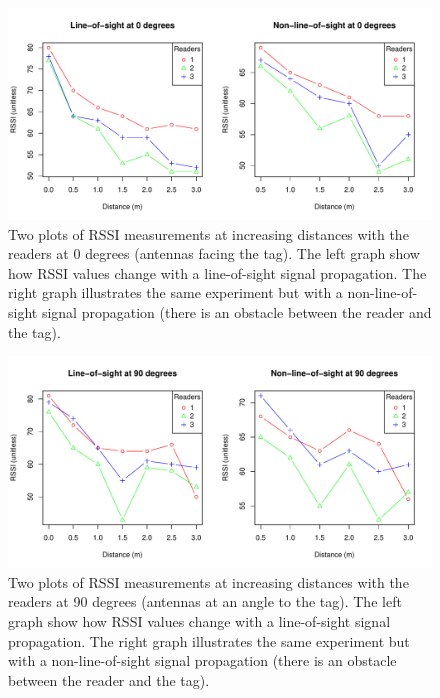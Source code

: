 \begin{figure}[H]
	\begin{center}
		\includegraphics[width=1\textwidth]{figures/rssi_distance_3m_0deg}
		\caption{Two plots of RSSI measurements at increasing distances with the readers at 0 degrees (antennas facing the tag). The left graph show how RSSI values change with a line-of-sight signal propagation. The right graph illustrates the same experiment but with a non-line-of-sight signal propagation (there is an obstacle between the reader and the tag).}
	\end{center}
\end{figure}

\begin{figure}[H]
	\begin{center}
		\includegraphics[width=1\textwidth]{figures/rssi_distance_3m_90deg}
		\caption{Two plots of RSSI measurements at increasing distances with the readers at 90 degrees (antennas at an angle to the tag). The left graph show how RSSI values change with a line-of-sight signal propagation. The right graph illustrates the same experiment but with a non-line-of-sight signal propagation (there is an obstacle between the reader and the tag).}
	\end{center}
\end{figure}

